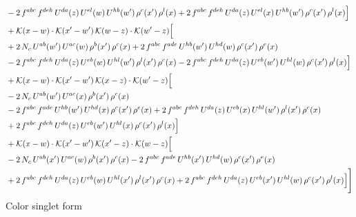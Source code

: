 \documentclass[9pt]{article}
\numberwithin{equation}{section}
\begin{document}
\begin{align}
& -2\,f^{abc}\,f^{deh}\,U^{da}(z)\,U^{el}(w)\,U^{hb}(w')\,\rho^{c}(x')\,\rho^{l}(x) +2\,f^{abc}\,f^{deh}\,U^{da}(z)\,U^{el}(x)\,U^{hb}(w')\,\rho^{c}(x')\,\rho^{l}(x)\Big]\notag\\
& +\mathcal{K}(x-w)\cdot\mathcal{K}(x'-w')\,\mathcal{K}(w-z)\cdot\mathcal{K}(w'-z)\Big[\notag\\
& +2\,N_{c}\,U^{ab}(w')\,U^{ac}(w)\,\rho^{b}(x')\,\rho^{c}(x) +2\,f^{abc}\,f^{ade}\,U^{hb}(w')\,U^{hd}(w)\,\rho^{c}(x')\,\rho^{e}(x)\notag\\
& -2\,f^{abc}\,f^{deh}\,U^{da}(z)\,U^{eb}(w)\,U^{hl}(w')\,\rho^{l}(x')\,\rho^{c}(x) -2\,f^{abc}\,f^{deh}\,U^{da}(z)\,U^{eb}(w')\,U^{hl}(w)\,\rho^{c}(x')\,\rho^{l}(x)\Big]\notag\\
& +\mathcal{K}(x-w)\cdot\mathcal{K}(x'-w')\,\mathcal{K}(x-z)\cdot\mathcal{K}(w'-z)\Big[\notag\\
& -2\,N_{c}\,U^{ab}(w')\,U^{ac}(x)\,\rho^{b}(x')\,\rho^{c}(x)\notag\\
& -2\,f^{abc}\,f^{ade}\,U^{hb}(w')\,U^{hd}(x)\,\rho^{c}(x')\,\rho^{e}(x) +2\,f^{abc}\,f^{deh}\,U^{da}(z)\,U^{eb}(x)\,U^{hl}(w')\,\rho^{l}(x')\,\rho^{c}(x)\notag\\
& +2\,f^{abc}\,f^{deh}\,U^{da}(z)\,U^{eb}(w')\,U^{hl}(x)\,\rho^{c}(x')\,\rho^{l}(x)\Big]\notag\\
& +\mathcal{K}(x-w)\cdot\mathcal{K}(x'-w')\,\mathcal{K}(x'-z)\cdot\mathcal{K}(w-z)\Big[\notag\\
& -2\,N_{c}\,U^{ab}(x')\,U^{ac}(w)\,\rho^{b}(x')\,\rho^{c}(x) -2\,f^{abc}\,f^{ade}\,U^{hb}(x')\,U^{hd}(w)\,\rho^{c}(x')\,\rho^{e}(x)\notag\\
& +2\,f^{abc}\,f^{deh}\,U^{da}(z)\,U^{eb}(w)\,U^{hl}(x')\,\rho^{l}(x')\,\rho^{c}(x) +2\,f^{abc}\,f^{deh}\,U^{da}(z)\,U^{eb}(x')\,U^{hl}(w)\,\rho^{c}(x')\,\rho^{l}(x)\Big]\Bigg]
\end{align}
Color singlet form
\end{document}
